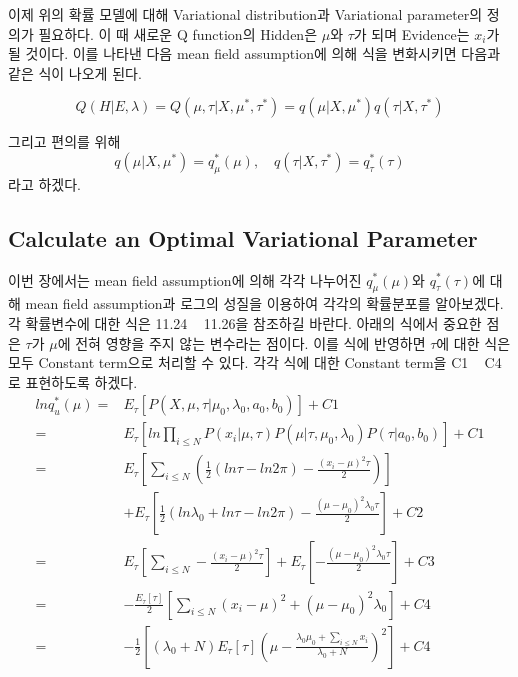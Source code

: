 \documentclass[draft=false]{oblivoir}
\begin{document}
이제 위의 확률 모델에 대해 Variational distribution과 Variational parameter의 정의가 필요하다. 이 때 새로운 Q function의 Hidden은 $\mu$와 $\tau$가 되며 Evidence는 $x_{i}$가 될 것이다. 이를 나타낸 다음 mean field assumption에 의해 식을 변화시키면 다음과 같은 식이 나오게 된다. 

\begin{equation}
Q(H|E, \lambda) = Q(\mu, \tau | X,\mu^{*},\tau^{*})=q(\mu |X,\mu^{*})q(\tau|X,\tau^{*})
\label{eq:11-2-6}
\end{equation}

그리고 편의를 위해
\begin{equation}
q(\mu |X,\mu^{*}) = q_{\mu}^{*}(\mu), \quad q(\tau|X,\tau^{*}) = q_{\tau}^{*}(\tau)
\label{eq:11-2-7}
\end{equation}
라고 하겠다.

\subsection{Calculate an Optimal Variational Parameter}
이번 장에서는 mean field assumption에 의해 각각 나누어진 $q_{\mu}^{*}(\mu)$와 $q_{\tau}^{*}(\tau)$에 대해 mean field assumption과 로그의 성질을 이용하여 각각의 확률분포를 알아보겠다. 각 확률변수에 대한 식은 11.24 ~ 11.26을 참조하길 바란다. 아래의 식에서 중요한 점은 $\tau$가 $\mu$에 전혀 영향을 주지 않는 변수라는 점이다. 이를 식에 반영하면 $\tau$에 대한 식은 모두 Constant term으로 처리할 수 있다. 각각 식에 대한 Constant term을 C1 ~ C4로 표현하도록 하겠다.  \\
\begin{align}
lnq_{u}^*(\mu)\nonumber = {} & E_{\tau}\left[ P(X,\mu,\tau|\mu_{0},\lambda_{0},a_{0},b_{0}) \right] +C1\nonumber\\
= {} &	E_{\tau} \left[ln\prod_{i\leq N}{P(x_{i}|\mu, \tau) P(\mu|\tau,\mu_{0},\lambda_{0})P(\tau|a_{0},b_{0})} \right] + C1\nonumber\\
= {} & E_{\tau}\left[ \sum_{i \leq N}\left( \frac{1}{2}(ln \tau -ln2 \pi) - \frac{(x_{i}-\mu)^{2}\tau}{2} \right) \right]\nonumber\\
& + E_{\tau}\left[ \frac{1}{2}(ln \lambda_{0} + ln \tau-ln2 \pi ) - \frac{(\mu -\mu_{0})^{2} \lambda_{0} \tau}{2}\right] + C2\nonumber\\
= {} & E_{\tau}\left[ \sum_{i \leq N} - \frac{(x_{i}-\mu)^{2}\tau}{2} \right] + E_{\tau}\left[ - \frac{(\mu -\mu_{0})^{2} \lambda_{0} \tau}{2}\right] + C3\nonumber\\
= {} & -\frac{E_{\tau}[\tau]}{2}\left[ \sum_{i \leq N} (x_{i}-\mu)^{2} + (\mu -\mu_{0})^{2} \lambda_{0}\right] + C4 \nonumber\\
= {} & -\frac{1}{2}\left[(\lambda_{0} +N)E_{\tau}[\tau] \left(\mu - \frac{\lambda_{0}\mu_{0}+\sum_{i \leq N}x_{i}}{\lambda_{0}+N}   \right)^{2}\right] +C4
\label{eq:11-2-8}
\end{align}
\end{document}
